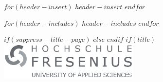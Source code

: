 

$for(header-insert)$
$header-insert$
$endfor$

$for(header-includes)$
$header-includes$
$endfor$

\makeatletter
\xpatchcmd{\appendix}
  {\par}
  {\par}
  {}{}
\makeatother



$if(suppress-title-page)$
$else$
  \frontmatter
$endif$
  $if(title)$
  \cleardoublepage
\thispagestyle{empty}
\hfill \includegraphics[width=7cm]{logo.png}\\
